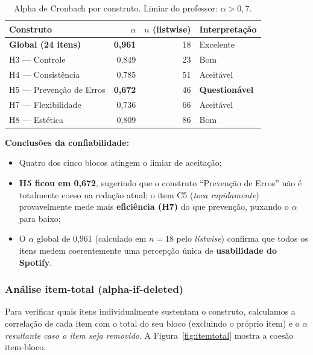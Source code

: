 \documentclass[12pt,a4paper]{article}
\begin{document}
\begin{table}[h]
\centering
\caption{Alpha de Cronbach por construto. Limiar do professor: $\alpha > 0{,}7$.}
\label{tab:cronbach}
\small
\begin{tabular}{lrrl}
\toprule
\textbf{Construto} & \textbf{$\alpha$} & \textbf{$n$ (listwise)} & \textbf{Interpretação}\\
\midrule
\textbf{Global (24 itens)}     & \textbf{0{,}961} & 18 & Excelente\\
H3 --- Controle                & 0{,}849          & 23 & Bom\\
H4 --- Consistência            & 0{,}785          & 51 & Aceitável\\
H5 --- Prevenção de Erros      & \textbf{0{,}672} & 46 & \textbf{Questionável}\\
H7 --- Flexibilidade           & 0{,}736          & 66 & Aceitável\\
H8 --- Estética                & 0{,}809          & 86 & Bom\\
\bottomrule
\end{tabular}
\end{table}

\textbf{Conclusões da confiabilidade:}
\begin{itemize}[leftmargin=*]
  \item Quatro dos cinco blocos atingem o limiar de aceitação;
  \item \textbf{H5 ficou em 0{,}672}, sugerindo que o construto ``Prevenção de Erros''
        não é totalmente coeso na redação atual; o item C5 (\emph{toca rapidamente})
        provavelmente mede mais \textbf{eficiência (H7)} do que prevenção, puxando o
        $\alpha$ para baixo;
  \item O $\alpha$ global de 0{,}961 (calculado em $n=18$ pelo \emph{listwise}) confirma
        que todos os itens medem coerentemente uma percepção única de
        \textbf{usabilidade do Spotify}.
\end{itemize}

\subsubsection*{Análise item-total (alpha-if-deleted)}
Para verificar quais itens individualmente sustentam o construto, calculamos a
correlação de cada item com o total do seu bloco (excluindo o próprio item) e
o $\alpha$ \emph{resultante caso o item seja removido}. A
Figura~\ref{fig:itemtotal} mostra a coesão item-bloco.
\end{document}
